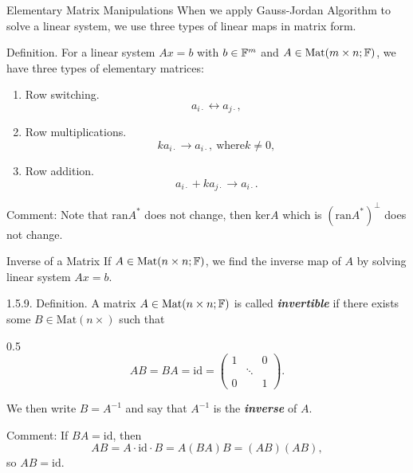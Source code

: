 \documentclass[hyperref={pdfpagelabels=true}]{beamer}
\newcommand{\Mat}{\text{Mat}}
\newcommand{\highlightg}[1]{\textcolor[rgb]{0.1,0.5,0.3}{\emph{\textbf{#1}}}}
\newcommand{\<}{\langle}
\renewcommand{\>}{\rangle}
\newenvironment{shrinkeq}[1]%
{ \bgroup
  \addtolength\abovedisplayshortskip{#1}
  \addtolength\abovedisplayskip{#1}
  \addtolength\belowdisplayshortskip{#1}
  \addtolength\belowdisplayskip{#1}}
{\egroup\ignorespacesafterend}
\begin{document}
\begin{frame}{Elementary Matrix Manipulations}
    When we apply Gauss-Jordan Algorithm to solve a linear system, we use three types of linear maps in matrix form.
    \begin{block}{Definition.}
        For a linear system $Ax = b$ with $b \in \mathbb{F}^{m}$ and $A \in \Mat(m \times n;\F)$, we have three types of elementary matrices:
        \begin{enumerate}
            \item Row switching. 
            \begin{shrinkeq}{-0.3em}
            \[a_{i \cdot} \leftrightarrow a_{j \cdot},\]
            \end{shrinkeq}
            \item Row multiplications.
            \begin{shrinkeq}{-0.3em}
            \[ka_{i \cdot} \rightarrow a_{i\cdot}, \ \text{where}k \neq 0,\]
            \end{shrinkeq}
            \item Row addition.
            \begin{shrinkeq}{-0.3em}
            \[a_{i\cdot}+ka_{j\cdot} \rightarrow a_{i\cdot}.\] 
            \end{shrinkeq}
        \end{enumerate}
    \end{block}
    \begin{block}{Comment:}
        Note that $\text{ran}A^{*}$ does not change, then $\text{ker}A$ which is $(\text{ran}A^{*})^{\bot}$ does not change.
    \end{block}
\end{frame} 
\begin{frame}{Inverse of a Matrix}
    If $A \in \Mat(n \times n;\F)$, we find the inverse map of $A$ by solving linear system $Ax = b$.
    \begin{block}{1.5.9. Definition.}
        A matrix $A \in \Mat(n \times n;\F)$ is called \highlightg{invertible} if there exists some $B \in \Mat(n \times )$ such that 
        \begin{spacing}{0.5}
        \[AB = BA = \text{id} = 
        \begin{pmatrix}
            1 & & 0\\
              & \ddots & \\
              0 & & 1
        \end{pmatrix}.\]
        \end{spacing}
        We then write $B = A^{-1}$ and say that $A^{-1}$ is the \highlightg{inverse} of $A$.
    \end{block}
    \begin{block}{Comment:}
        If $BA = \text{id}$, then
        \begin{shrinkeq}{-0.3em} 
        \[AB = A \cdot\text{id} \cdot B = A(BA)B =(AB)(AB),\]
        \end{shrinkeq}
        so $AB = \text{id}$.
    \end{block}
\end{frame}
\end{document}
